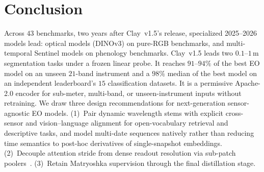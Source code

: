 \section{Conclusion}
\label{sec:conclusion}

Across $43$ benchmarks, two years after Clay~v1.5's release, specialized 2025--2026 models lead: optical models (DINOv3) on pure-RGB benchmarks, and multi-temporal Sentinel models on phenology benchmarks. Clay~v1.5 leads two $0.1\text{--}1\,\text{m}$ segmentation tasks under a frozen linear probe. It reaches $91\text{--}94\%$ of the best EO model on an unseen $21$-band instrument and a $98\%$ median of the best model on an independent leaderboard's $15$ classification datasets. It is a permissive Apache-2.0 encoder for sub-meter, multi-band, or unseen-instrument inputs without retraining. We draw three design recommendations for next-generation sensor-agnostic EO models. (1)~Pair dynamic wavelength stems with explicit cross-sensor and vision--language alignment for open-vocabulary retrieval and descriptive tasks, and model multi-date sequences natively rather than reducing time semantics to post-hoc derivatives of single-snapshot embeddings. (2)~Decouple attention stride from dense readout resolution via sub-patch poolers~\cite{olmoearth2026v13}. (3)~Retain Matryoshka supervision through the final distillation stage.

